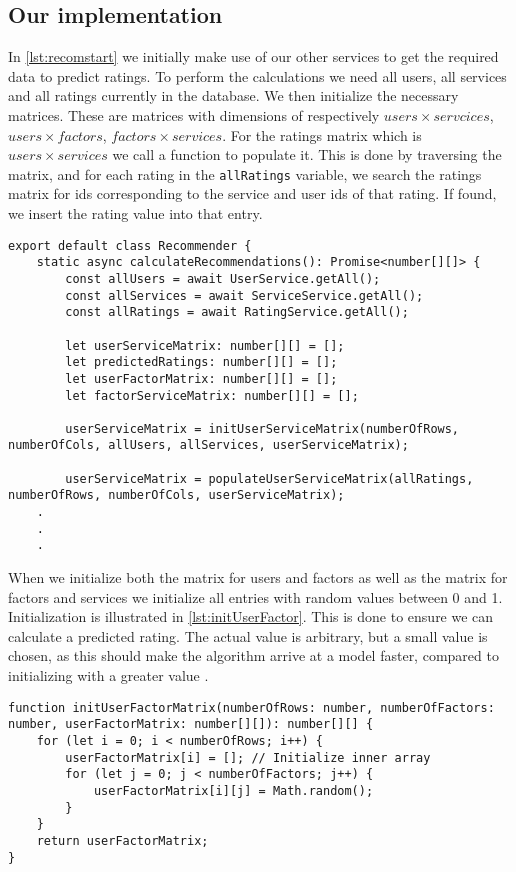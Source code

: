 \subsection{Our implementation}
In \autoref{lst:recomstart} we initially make use of our other services to get the required data to predict ratings.
To perform the calculations we need all users, all services and all ratings currently in the database.
We then initialize the necessary matrices.
These are matrices with dimensions of respectively $users \times servcices$, $users \times factors$, $factors \times services$. 
For the ratings matrix which is $users \times services$ we call a function to populate it.
This is done by traversing the matrix, and for each rating in the \texttt{allRatings} variable, we search the ratings matrix for ids corresponding to the service and user ids of that rating.
If found, we insert the rating value into that entry.
\begin{lstlisting}[caption={The start of the recommender}, captionpos=b, label={lst:recomstart}]
export default class Recommender {
    static async calculateRecommendations(): Promise<number[][]> {
        const allUsers = await UserService.getAll();
        const allServices = await ServiceService.getAll();
        const allRatings = await RatingService.getAll();
    
        let userServiceMatrix: number[][] = [];
        let predictedRatings: number[][] = [];
        let userFactorMatrix: number[][] = [];
        let factorServiceMatrix: number[][] = [];

        userServiceMatrix = initUserServiceMatrix(numberOfRows, numberOfCols, allUsers, allServices, userServiceMatrix);

		userServiceMatrix = populateUserServiceMatrix(allRatings, numberOfRows, numberOfCols, userServiceMatrix);
    .
    .
    .
\end{lstlisting}
When we initialize both the matrix for users and factors as well as the matrix for factors and services we initialize all entries with random values between 0 and 1.
Initialization is illustrated in \autoref{lst:initUserFactor}.
This is done to ensure we can calculate a predicted rating.
The actual value is arbitrary, but a small value is chosen, as this should make the algorithm arrive at a model faster, compared to initializing with a greater value \cite{FunkMatrixFactorization}.
\begin{lstlisting}[caption={Initializing the user and factor matrix}, captionpos=b, label={lst:initUserFactor}]
function initUserFactorMatrix(numberOfRows: number, numberOfFactors: number, userFactorMatrix: number[][]): number[][] {
    for (let i = 0; i < numberOfRows; i++) {
        userFactorMatrix[i] = []; // Initialize inner array
        for (let j = 0; j < numberOfFactors; j++) {
            userFactorMatrix[i][j] = Math.random();
        }
    }   
    return userFactorMatrix;
}
\end{lstlisting}
